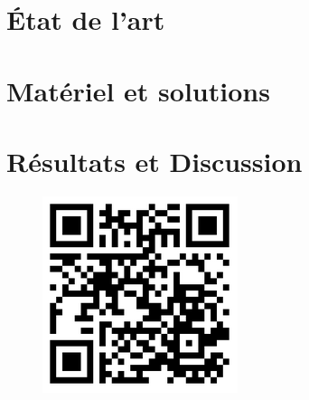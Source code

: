 \documentclass[12pt]{report}
\begin{document}
\begin{onehalfspace}
\chapter{État de l'art}
	

\chapter{Matériel et solutions}{\label{chap:materiel_et_solutions}}
	
	
\chapter{Résultats et Discussion}
	

\lhead[]{} \rhead[]{} \chead[]{}
\conclusion
	


%

\appendix


\clearpage
{}
\setcounter{tocdepth}{1}
\tableofcontents
{}

\vspace*{1cm}	
	\begin{center}
		\begin{figure}[!h]
			\includegraphics[scale=.2]{images/thesis_project_qrcode.png}
		\end{figure}
	\end{center}


\end{onehalfspace}
\end{document}

